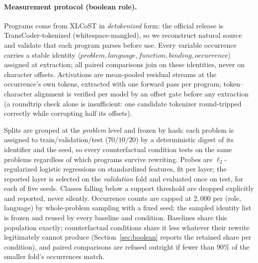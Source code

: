 
\paragraph{Measurement protocol (boolean role).}
Programs come from XLCoST \citep{zhu2022xlcost} in \emph{detokenized}
form: the official release is TransCoder-tokenized (whitespace-mangled),
so we reconstruct natural source and validate that each program parses
before use. Every variable occurrence carries a stable identity
$\langle\textit{problem},\textit{language},\textit{function},
\textit{binding},\textit{occurrence}\rangle$ assigned at extraction; all
paired comparisons join on these identities, never on character offsets.
Activations are mean-pooled residual streams at the occurrence's own
tokens, extracted with one forward pass per program; token--character
alignment is verified per model by an offset gate before any extraction
(a roundtrip check alone is insufficient: one candidate tokenizer
round-tripped correctly while corrupting half its offsets).

Splits are grouped at the \emph{problem} level and frozen by hash: each
problem is assigned to train/validation/test ($70/10/20$) by a
deterministic digest of its identifier and the seed, so every
counterfactual condition tests on the same problems regardless of which
programs survive rewriting. Probes are $\ell_2$-regularized logistic
regressions on standardized features, fit per layer; the reported layer is
selected on the \emph{validation} fold and evaluated once on test, for
each of five seeds. Classes falling below a support threshold are dropped
explicitly and reported, never silently. Occurrence counts are capped at
$2{,}000$ per (role, language) by whole-problem sampling with a fixed
seed; the sampled identity list is frozen and reused by every baseline
and condition. Baselines share this population exactly; counterfactual
conditions share it less whatever their rewrite legitimately cannot
produce (Section~\ref{sec:boolean} reports the retained share per
condition), and paired comparisons are refused outright if fewer than
$90\%$ of the smaller fold's occurrences match.

